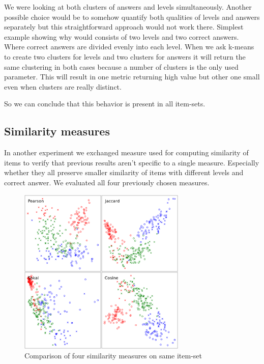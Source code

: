 \documentclass[
  digital, %
  table,   %
  nolof,     %
  nolot,     %
  nocover,
  color
]{fithesis3}
\begin{document}

We were looking at both clusters of answers and levels simultaneously. Another possible choice would be to somehow quantify both qualities of levels and answers separately but this straightforward approach would not work there. Simplest example showing why would consists of two levels and two correct answers. Where correct answers are divided evenly into each level. When we ask k-means to create two clusters for levels and two clusters for answers it will return the same clustering in both cases because a number of clusters is the only used parameter. This will result in one metric returning high value but other one small even when clusters are really distinct.


So we can conclude that this behavior is present in all item-sets.


\subsection{Similarity measures}\label{evaluation-similarity-measures}

In another experiment we exchanged measure used for computing similarity of items to verify that previous results aren't specific to a single measure. Especially whether they all preserve smaller similarity of items with different levels and correct answer. We evaluated all four previously chosen measures.

\begin{figure}
  \includegraphics[height=8cm]{img/measures}
  \caption{Comparison of four similarity measures on same item-set}
  \label{fig:measures}
\end{figure}
\end{document}
